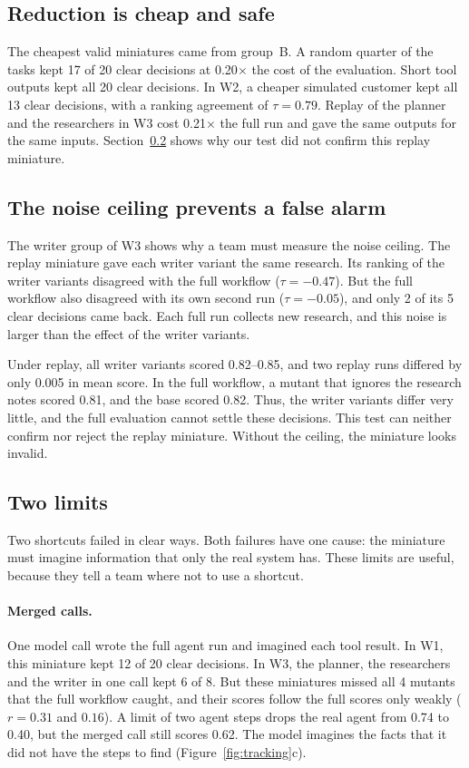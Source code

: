\subsection{Reduction is cheap and safe}
The cheapest valid miniatures came from group~B. A random quarter of the tasks kept 17 of 20 clear
decisions at 0.20$\times$ the cost of the evaluation. Short tool outputs kept all 20 clear
decisions. In W2, a cheaper simulated customer kept all 13 clear
decisions, with a ranking agreement of $\tau = 0.79$. Replay of the planner and the researchers in
W3 cost 0.21$\times$ the full run and gave the same outputs for the same inputs.
Section~\ref{sec:ceiling} shows why our test did not confirm this replay miniature.

\subsection{The noise ceiling prevents a false alarm}
\label{sec:ceiling}
The writer group of W3 shows why a team must measure the noise ceiling. The replay miniature gave
each writer variant the same research. Its ranking of the writer variants disagreed with the full
workflow ($\tau = -0.47$). But the full workflow also disagreed with its own second run
($\tau = -0.05$), and only 2 of its 5 clear decisions came back. Each full run collects new
research, and this noise is larger than the effect of the writer variants.

Under replay, all writer variants scored 0.82--0.85, and two replay runs differed by only 0.005 in
mean score. In the full workflow, a mutant that ignores the research notes scored 0.81, and the base
scored 0.82. Thus, the writer variants differ very little, and the full evaluation cannot settle
these decisions. This test can neither confirm nor reject the replay miniature. Without the
ceiling, the miniature looks invalid.

\subsection{Two limits}
\label{sec:limits-found}
Two shortcuts failed in clear ways. Both failures have one cause: the miniature must imagine
information that only the real system has. These limits are useful, because they tell a team where
not to use a shortcut.

\paragraph{Merged calls.}
One model call wrote the full agent run and imagined each tool result. In W1, this miniature kept
12 of 20 clear decisions. In W3, the planner, the researchers and the writer in one call kept 6 of 8.
But these miniatures missed all 4 mutants that the full workflow caught, and their scores follow
the full scores only weakly ($r = 0.31$ and $0.16$). A limit of two agent steps drops the real
agent from 0.74 to 0.40, but the merged call still scores 0.62. The model imagines the facts that it
did not have the steps to find (Figure~\ref{fig:tracking}c).


